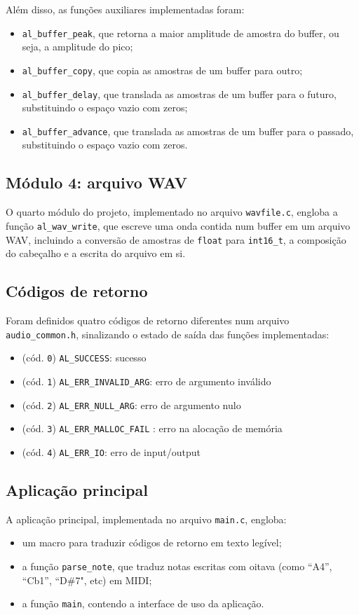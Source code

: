 \documentclass{article}
\begin{document}
Além disso, as funções auxiliares implementadas foram:
\begin{itemize}
    \item \texttt{al\_buffer\_peak}, que retorna a maior amplitude de amostra do buffer, ou seja, a amplitude do pico;
    \item \texttt{al\_buffer\_copy}, que copia as amostras de um buffer para outro;
    \item \texttt{al\_buffer\_delay}, que translada as amostras de um buffer para o futuro, substituindo o espaço vazio com zeros;
    \item \texttt{al\_buffer\_advance}, que translada as amostras de um buffer para o passado, substituindo o espaço vazio com zeros.
\end{itemize}

\subsection{Módulo 4: arquivo WAV}
O quarto módulo do projeto, implementado no arquivo \texttt{wavfile.c}, engloba a função \texttt{al\_wav\_write}, que escreve uma onda contida num buffer em um arquivo WAV, incluindo a conversão de amostras de \texttt{float} para \texttt{int16\_t}, a composição do cabeçalho e a escrita do arquivo em si.

\subsection{Códigos de retorno}
Foram definidos quatro códigos de retorno diferentes num arquivo \texttt{audio\_common.h}, sinalizando o estado de saída das funções implementadas:
\begin{itemize}
    \item (cód. \texttt{0}) \texttt{AL\_SUCCESS}: sucesso
    \item (cód. \texttt{1}) \texttt{AL\_ERR\_INVALID\_ARG}: erro de argumento inválido
    \item (cód. \texttt{2}) \texttt{AL\_ERR\_NULL\_ARG}: erro de argumento nulo
    \item (cód. \texttt{3}) \texttt{AL\_ERR\_MALLOC\_FAIL} : erro na alocação de memória
    \item (cód. \texttt{4}) \texttt{AL\_ERR\_IO}: erro de input/output
\end{itemize}

\subsection{Aplicação principal}
A aplicação principal, implementada no arquivo \texttt{main.c}, engloba:
\begin{itemize}
    \item um macro para traduzir códigos de retorno em texto legível;
    \item a função \texttt{parse\_note}, que traduz notas escritas com oitava (como ``A4'', ``Cb1'', ``D\#7", etc) em MIDI;
    \item a função \texttt{main}, contendo a interface de uso da aplicação.
\end{itemize}
\end{document}
